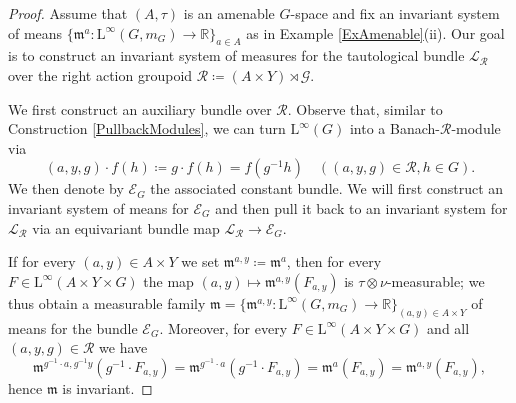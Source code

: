 \documentclass[11pt, oneside]{amsart}
\theoremstyle{definition}
\theoremstyle{remark}
\theoremstyle{TheoremNum}
\renewcommand{\L}{\mathfrak}
\newcommand{\cE}{\mathcal E}
\newcommand{\Linf}{\mathrm{L}^{\infty}}
\newcommand{\cR}{\mathcal{R}}
\newcommand{\cL}{\mathcal L}
\begin{document}
\begin{proof} Assume that $(A, \tau)$ is an amenable $G$-space and fix an invariant system of means $\{\L m^a:\Linf(G,m_G)\to \mathbb{R}\}_{a\in A}$ as in Example \ref{ExAmenable}(ii).
Our goal is to construct an invariant system of measures for the tautological bundle $\cL_\cR$ over the right action groupoid $\mathcal{R}\coloneqq(A\times Y)\rtimes \mathcal{G}$.

We first construct an auxiliary bundle over $\cR$. Observe that, similar to Construction \ref{PullbackModules}, we can turn $\Linf(G)$ into a Banach-$\cR$-module via
\[
(a, y, g)\cdot f(h)\coloneqq g\cdot f(h)=f(g^{-1} h) \quad ((a,y, g) \in \cR, h \in G).
\]
We then denote by $\cE_G$ the associated constant bundle. We will first construct an invariant system of means for $\cE_G$ and then pull it back to an invariant system for $\cL_{\cR}$ via an equivariant bundle map $\cL_\cR \to \cE_G$.

If for every $(a,y) \in A \times Y$ we set $\L m^{a,y} \coloneqq \L m^a$, then for every $F \in  \Linf(A\times Y\times G)$ the map $(a,y)\mapsto \L m^{a,y}(F_{a,y})$ is $\tau\otimes \nu$-measurable; we thus obtain a measurable family $\L m = \{\L m^{a,y}:\Linf(G,m_G)\to \mathbb{R}\}_{(a,y)\in A\times Y}$ of means for the bundle $\cE_G$. Moreover, for every $F \in  \Linf(A\times Y\times G)$ and all $(a,y,g) \in \cR$ we have
\[
 \L m^{g^{-1}\cdot a,g^{-1}y} (g^{-1}\cdot F_{a,y})  =  \L m^{g^{-1}\cdot a} (g^{-1}\cdot F_{a,y}) =  \L m^a(F_{a,y})=\L m^{ a,y} (F_{a,y}),
\]
hence $\L m$ is invariant. 


\end{proof}
\end{document}
